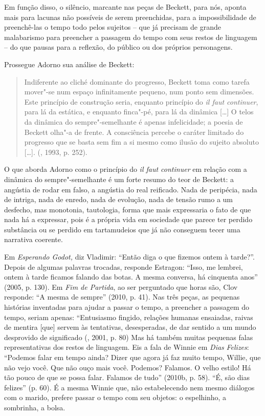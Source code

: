 {Em função disso, o silêncio, marcante nas peças de Beckett, para nós,
aponta mais para lacunas não possíveis de serem preenchidas, para a
impossibilidade de preenchê-las o tempo todo pelos sujeitos -- que já
precisam de grande malabarismo para preencher a passagem do tempo com
seus restos de linguagem -- do que pausas para a reflexão, do público ou
dos próprios personagens.

Prossegue Adorno sua análise de Beckett:

\begin{quote}
Indiferente ao cliché dominante do progresso, Beckett toma como tarefa
mover"-se num espaço infinitamente pequeno, num ponto sem dimensões. Este
princípio de construção seria, enquanto princípio do \emph{il faut
continuer}, para lá da estática, e enquanto finca"-pé, para lá da
dinâmica [\ldots{}] O telos da dinâmica do sempre"-semelhante é
apenas infelicidade; a poesia de Beckett olha"-a de frente. A consciência
percebe o caráter limitado do progresso que se basta sem fim a si mesmo
como ilusão do sujeito absoluto [\ldots{}]. (, 1993, p.
252).
\end{quote}

O que aborda Adorno como o princípio do \emph{il faut continuer} em
relação com a dinâmica do sempre"-semelhante é um forte resumo do teor de
Beckett: a angústia de rodar em falso, a angústia do real reificado.
Nada de peripécia, nada de intriga, nada de enredo, nada de evolução,
nada de tensão rumo a um desfecho, mas monotonia, tautologia, forma que
mais expressaria o fato de que nada há a expressar, pois é a própria
vida em sociedade que parece ter perdido substância ou se perdido em
tartamudeios que já não conseguem tecer uma narrativa coerente.

Em \emph{Esperando Godot,} diz Vladimir: ``Então diga o que fizemos
ontem à tarde?''. Depois de algumas palavras trocadas, responde
Estragon: ``Isso, me lembrei, ontem à tarde ficamos falando das botas. A
mesma conversa, há cinquenta anos'' (2005, p. 130). Em \emph{Fim de
Partida}, ao ser perguntado que horas são, Clov responde: ``A mesma de
sempre'' (2010, p. 41). Nas três peças, as pequenas histórias inventadas
para ajudar a passar o tempo, a preencher a passagem do tempo, seriam
apenas: ``Entusiasmo fingido, relações humanas ensaiadas, raivas de
mentira [que] servem às tentativas, desesperadas, de dar sentido a
um mundo desprovido de significado (, 2001, p. 80) Mas há também
muitas pequenas falas representativas dos restos de linguagem. Eis a
fala de Winnie em \emph{Dias} \emph{Felizes}: ``Podemos falar em tempo
ainda? Dizer que agora já faz muito tempo, Willie, que não vejo você.
Que não ouço mais você. Podemos? Falamos. O velho estilo! Há tão pouco
de que se possa falar. Falamos de tudo'' (2010b, p. 58). ``É, são dias
felizes'' (p. 60). É a mesma Winnie que, não estabelecendo nem mesmo
diálogos com o marido, prefere passar o tempo com seu objetos: o
espelhinho, a sombrinha, a bolsa.

}
